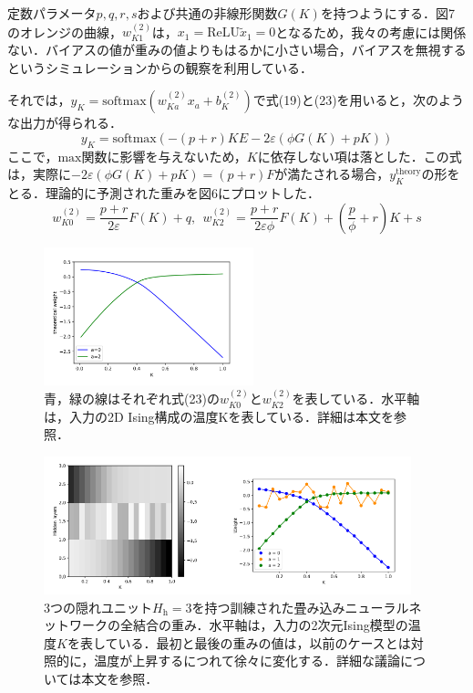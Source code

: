 \documentclass[a4paper,11pt]{jsarticle}
\begin{document}
定数パラメータ$p,q,r,s$および共通の非線形関数$G(K)$を持つようにする．図7のオレンジの曲線，$w^(2)_{K1}$は，$x_1 = \text{ReLU}\tilde{x}_1 = 0$となるため，我々の考慮には関係ない．バイアスの値が重みの値よりもはるかに小さい場合，バイアスを無視するというシミュレーションからの観察を利用している．\par
それでは，$y_K = \text{softmax}(w_{Ka}^{(2)}x_a + b_K^{(2)})$で式(19)と(23)を用いると，次のような出力が得られる．
\begin{equation}
  y_K = \text{softmax}(-(p+r)KE - 2\varepsilon(\phi G(K) + pK))
\end{equation}
ここで，$\text{max}$関数に影響を与えないため，$K$に依存しない項は落とした．この式は，実際に$-2\varepsilon (\phi G(K) + pK) = (p + r)F$が満たされる場合，$y_K^{\text{theory}}$の形をとる．理論的に予測された重みを図6にプロットした．
\begin{equation}
  w_{K0}^{(2)} = \frac{p+r}{2\varepsilon}F(K) + q, \ \
  w_{K2}^{(2)} = \frac{p+r}{2\varepsilon \phi}F(K) + \left( \frac{p}{\phi} + r \right)K + s
\end{equation}
\begin{figure}
  \begin{center}
    \includegraphics[height=4cm]{image/Figure6.png}
    \caption{青，緑の線はそれぞれ式(23)の$w_{K0}^{(2)}$と$w_{K2}^{(2)}$を表している．水平軸は，入力の2D Ising構成の温度Kを表している．詳細は本文を参照．}
  \end{center}
\end{figure}
\begin{figure}
  \begin{center}
    \includegraphics[height=4cm]{image/Figure7.png}
    \caption{3つの隠れユニット$H_{\text{h}}=3$を持つ訓練された畳み込みニューラルネットワークの全結合の重み．水平軸は，入力の2次元Ising模型の温度$K$を表している．最初と最後の重みの値は，以前のケースとは対照的に，温度が上昇するにつれて徐々に変化する．詳細な議論については本文を参照．}
  \end{center}
\end{figure}
\end{document}
